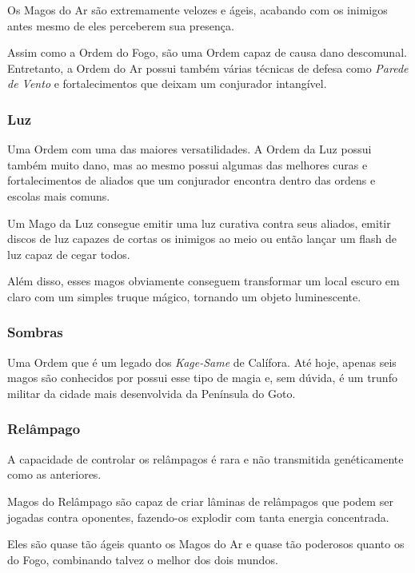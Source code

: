 \documentclass{RPG_Adventure}[2021/10/20]
\begin{document}
Os Magos do Ar são extremamente velozes e ágeis, acabando com os inimigos antes
mesmo de eles perceberem sua presença.

Assim como a Ordem do Fogo, são uma Ordem capaz de causa dano descomunal.
Entretanto, a Ordem do Ar possui também várias técnicas de defesa como
\textit{Parede de Vento} e fortalecimentos que deixam um conjurador intangível.

\subsubsection*{Luz}%
\label{ssub:luz}

Uma Ordem com uma das maiores versatilidades. A Ordem da Luz possui também muito
dano, mas ao mesmo possui algumas das melhores curas e fortalecimentos de
aliados que um conjurador encontra dentro das ordens e escolas mais comuns.

Um Mago da Luz consegue emitir uma luz curativa contra seus aliados, emitir
discos de luz capazes de cortas os inimigos ao meio ou então lançar um flash de
luz capaz de cegar todos.

Além disso, esses magos obviamente conseguem transformar um local escuro em
claro com um simples truque mágico, tornando um objeto luminescente.

\subsubsection*{Sombras}%
\label{ssub:sombras}

Uma Ordem que é um legado dos \textit{Kage-Same} de Calífora. Até hoje, apenas
seis magos são conhecidos por possui esse tipo de magia e, sem dúvida, é um
trunfo militar da cidade mais desenvolvida da Península do Goto.

\subsubsection*{Relâmpago}%
\label{ssub:relampago}

A capacidade de controlar os relâmpagos é rara e não transmitida genéticamente
como as anteriores.

Magos do Relâmpago são capaz de criar lâminas de relâmpagos que podem ser
jogadas contra oponentes, fazendo-os explodir com tanta energia concentrada.

Eles são quase tão ágeis quanto os Magos do Ar e quase tão poderosos quanto os
do Fogo, combinando talvez o melhor dos dois mundos.
\end{document}
